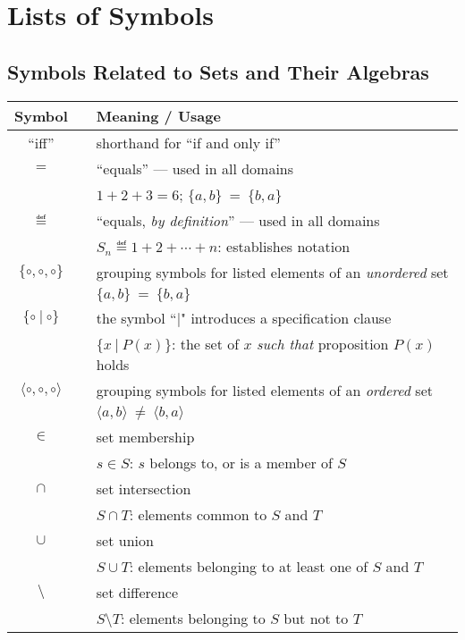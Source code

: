 
\chapter{Lists of Symbols}

\section*{Symbols Related to Sets and Their Algebras}

\begin{tabular}{c|cl}
{\bf Symbol} &  & {\bf Meaning} / {\bf Usage} \\ \hline
``iff''
  & & shorthand for ``if and only if'' \\
$=$
  & & ``equals'' --- used in all domains \\
  & & $1 + 2 + 3 = 6$; $\{a,b\} \ = \ \{b,a\}$ \\ \hline
$\eqdef$
  & & ``equals, {\em by definition}'' --- used in all domains \\
  & & $S_n \eqdef 1 + 2 + \cdots + n$: establishes notation \\ \hline
$\{ \circ, \circ, \circ \}$ 
  & & grouping symbols for listed elements of an {\em unordered} set \\
  & & $\{a,b\} \ = \ \{b,a\}$ \\ \hline
$\{ \circ \ | \ \circ \}$
  & & the symbol ``$|$" introduces a specification clause \\
  & & $\{x \ | \ P(x) \}$: the set of $x$ {\em such that} proposition $P(x)$ holds
   \\ \hline
$\langle \circ, \circ, \circ \rangle$
  & & grouping symbols for listed elements of an {\em ordered} set \\
  & & $\langle a,b\rangle \ \neq \ \langle b,a\rangle$ \\ \hline
$\in$
  & & set membership \\
  & & $s \in S$: $s$ belongs to, or is a member of $S$ \\ \hline
$\cap$
  & & set intersection \\
  &  & $S \cap T$: elements common to $S$ and $T$ \\ \hline
$\cup$
  &  & set union \\
  &  & $S \cup T$: elements belonging to at least one of $S$ and $T$ \\ \hline
$\setminus$
  & & set difference \\ 
  & & $S \setminus T$: elements belonging to $S$ but not to $T$ \\

\end{tabular}
